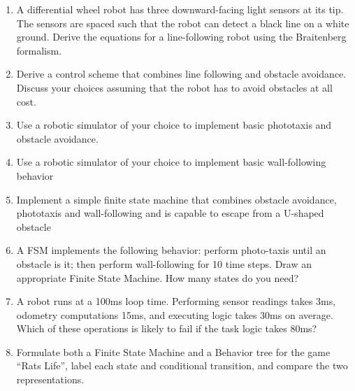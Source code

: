 \begin{enumerate}
\item A differential wheel robot has three downward-facing light sensors at its tip. The sensors are spaced such that the robot can detect a black line on a white ground. Derive the equations for a line-following robot using the Braitenberg formalism.
\item Derive a control scheme that combines line following and obstacle avoidance. Discuss your choices assuming that the robot has to avoid obstacles at all cost. 
\item Use a robotic simulator of your choice to implement basic phototaxis and obstacle avoidance. 
\item Use a robotic simulator of your choice to implement basic wall-following behavior
\item Implement a simple finite state machine that combines obstacle avoidance, phototaxis and wall-following and is capable to escape from a U-shaped obstacle
\item A FSM implements the following behavior: perform photo-taxis until an obstacle is it; then perform wall-following for 10 time steps. Draw an appropriate Finite State Machine. How many states do you need?
\item A robot runs at a 100ms loop time. Performing sensor readings takes 3ms, odometry computations 15ms, and executing logic takes 30ms on average. Which of these operations is likely to fail if the task logic takes 80ms?
\item Formulate both a Finite State Machine and a Behavior tree for the game ``Rats Life'', label each state and conditional transition, and compare the two representations.
\end{enumerate}
